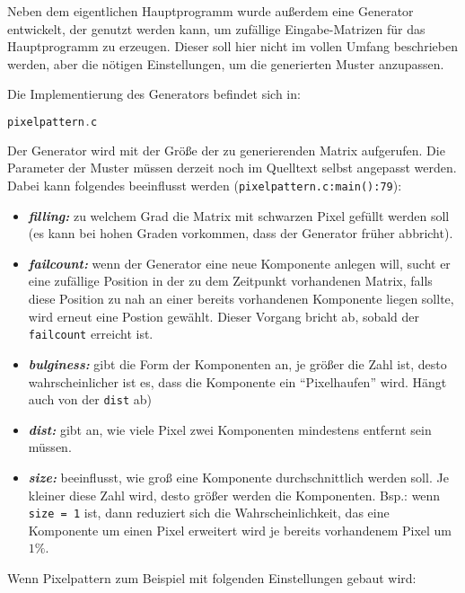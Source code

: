 \label{pixelpattern}

Neben dem eigentlichen Hauptprogramm wurde außerdem eine Generator entwickelt, der genutzt werden kann, um zufällige Eingabe-Matrizen für das Hauptprogramm zu erzeugen. Dieser soll hier nicht im vollen Umfang beschrieben werden, aber die nötigen Einstellungen, um die generierten Muster anzupassen.

Die Implementierung des Generators befindet sich in:

\begin{lstlisting}[language=C, aboveskip=\baselineskip, basicstyle=\footnotesize\ttfamily, lineskip=0pt]
pixelpattern.c
\end{lstlisting}

Der Generator wird mit der Größe der zu generierenden Matrix aufgerufen. Die Parameter der Muster müssen derzeit noch im Quelltext selbst angepasst werden. Dabei kann folgendes beeinflusst werden (\verb+pixelpattern.c:main():79+):

\begin{itemize}
	\item \textsl{\textbf{filling:}} zu welchem Grad die Matrix mit schwarzen Pixel gefüllt werden soll (es kann bei hohen Graden vorkommen, dass der Generator früher abbricht).
	\item \textsl{\textbf{failcount:}} wenn der Generator eine neue Komponente anlegen will, sucht er eine zufällige Position in der zu dem Zeitpunkt vorhandenen Matrix, falls diese Position zu nah an einer bereits vorhandenen Komponente liegen sollte, wird erneut eine Postion gewählt. Dieser Vorgang bricht ab, sobald der \verb+failcount+ erreicht ist.
	\item \textsl{\textbf{bulginess:}} gibt die Form der Komponenten an, je größer die Zahl ist, desto wahrscheinlicher ist es, dass die Komponente ein "`Pixelhaufen"' wird. Hängt auch von der \verb+dist+ ab)
	\item \textsl{\textbf{dist:}} gibt an, wie viele Pixel zwei Komponenten mindestens entfernt sein müssen.
	\item \textsl{\textbf{size:}} beeinflusst, wie groß eine Komponente durchschnittlich werden soll. Je kleiner diese Zahl wird, desto größer werden die Komponenten. Bsp.: wenn \verb+size = 1+ ist, dann reduziert sich die Wahrscheinlichkeit, das eine Komponente um einen Pixel erweitert wird je bereits vorhandenem Pixel um $1\%$.
\end{itemize}

Wenn Pixelpattern zum Beispiel mit folgenden Einstellungen gebaut wird:

